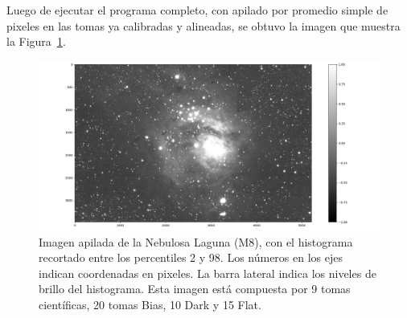 \documentclass[a4paper, 12pt]{article}
\begin{document}
Luego de ejecutar el programa completo, con apilado por promedio simple de pixeles en las tomas ya calibradas y alineadas, se obtuvo la imagen que muestra la Figura~\ref{fig:apiladofinal}.

\begin{figure}[!h]
  \centering
  \includegraphics[width=\textwidth]{img/apiladofinal_scikit.png}
  \caption{\label{fig:apiladofinal} Imagen apilada de la Nebulosa Laguna (M8), con el histograma recortado entre los percentiles 2 y 98. Los números en los ejes indican coordenadas en pixeles. La barra lateral indica los niveles de brillo del histograma. Esta imagen está compuesta por 9 tomas científicas, 20 tomas Bias, 10 Dark y 15 Flat.}
\end{figure}







   
\end{document}
